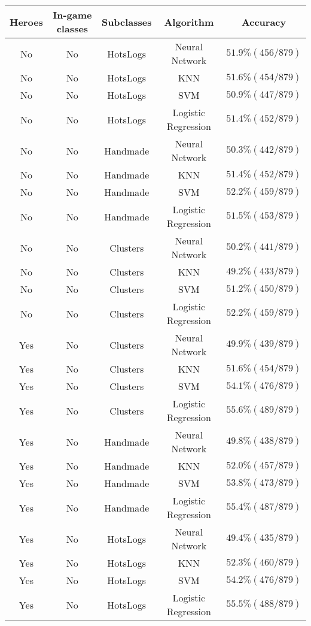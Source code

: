 \documentclass[11pt,letterpaper]{article}
\begin{document}
\noindent\begin{tabular}{c|c|c|c|c}
\textbf{Heroes} & \textbf{In-game classes} & \textbf{Subclasses} & \textbf{Algorithm} & \textbf{Accuracy} \\
\hline

No & No & HotsLogs & Neural Network & $51.9\% (456/879)$ \\
No & No & HotsLogs & KNN & $51.6\% (454/879)$ \\
No & No & HotsLogs & SVM & $50.9\% (447/879)$ \\
No & No & HotsLogs & Logistic Regression & $51.4\% (452/879)$ \\

No & No & Handmade & Neural Network & $50.3\% (442/879)$ \\
No & No & Handmade & KNN & $51.4\% (452/879)$ \\
No & No & Handmade & SVM & $52.2\% (459/879)$ \\
No & No & Handmade & Logistic Regression & $51.5\% (453/879)$ \\

No & No & Clusters & Neural Network & $50.2\% (441/879)$ \\
No & No & Clusters & KNN & $49.2\% (433/879)$ \\
No & No & Clusters & SVM & $51.2\% (450/879)$ \\
No & No & Clusters & Logistic Regression & $52.2\% (459/879)$ \\

Yes & No & Clusters & Neural Network & $49.9\% (439/879)$ \\
Yes & No & Clusters & KNN & $51.6\% (454/879)$ \\
Yes & No & Clusters& SVM & $54.1\% (476/879)$ \\
Yes & No & Clusters & Logistic Regression & $55.6\% (489/879)$ \\

Yes & No & Handmade & Neural Network & $49.8\% (438/879)$ \\
Yes & No & Handmade & KNN & $52.0\% (457/879)$ \\
Yes & No & Handmade & SVM & $53.8\% (473/879)$ \\
Yes & No & Handmade & Logistic Regression & $55.4\% (487/879)$ \\

Yes & No & HotsLogs & Neural Network & $49.4\% (435/879)$ \\
Yes & No & HotsLogs & KNN & $52.3\% (460/879)$ \\
Yes & No & HotsLogs & SVM & $54.2\% (476/879)$ \\
Yes & No & HotsLogs & Logistic Regression & $55.5\% (488/879)$ \\


\end{tabular}
\end{document}
